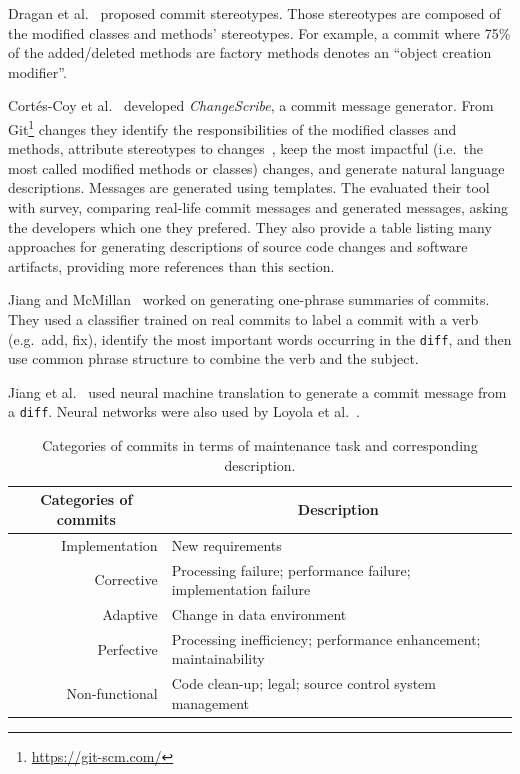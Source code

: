\documentclass[a4paper,11pt]{sdm_internship}
\theoremstyle{definition}
\begin{document}
Dragan et al.~\cite{dragan2011using} proposed commit stereotypes.
Those stereotypes are composed of the modified classes and methods' stereotypes.
For example, a commit where 75\% of the added/deleted methods are factory methods denotes an ``object creation modifier''.

Cort\'es-Coy et al.~\cite{cortes2014automatically,linares2015changescribe} developed \textit{ChangeScribe}, a commit message generator.
From Git\footnote{\url{https://git-scm.com/}} changes they identify the responsibilities of the modified classes and methods, attribute stereotypes to changes~\cite{dragan2011using}, keep the most impactful (i.e.\ the most called modified methods or classes) changes, and generate natural language descriptions.
Messages are generated using templates.
The evaluated their tool with survey, comparing real-life commit messages and generated messages, asking the developers which one they prefered.
They also provide a table listing many approaches for generating descriptions of source code changes and software artifacts, providing more references than this section.

Jiang and McMillan~\cite{jiang2017towards} worked on generating one-phrase summaries of commits.
They used a classifier trained on real commits to label a commit with a verb (e.g.\ add, fix), identify the most important words occurring in the \texttt{diff}, and then use common phrase structure to combine the verb and the subject.

Jiang et al.~\cite{jiang2017automatically} used neural machine translation to generate a commit message from a \texttt{diff}.
Neural networks were also used by Loyola et al.~\cite{loyola2017neural}.

\begin{table}
  \centering
  \begin{tabular}{rl}
    \toprule
    \multicolumn{1}{c}{\textbf{Categories of commits}} & \multicolumn{1}{c}{\textbf{Description}} \\
    \midrule
    Implementation & New requirements \\
    Corrective & Processing failure; performance failure; implementation failure \\
    Adaptive & Change in data environment \\
    Perfective & Processing inefficiency; performance enhancement; maintainability \\
    Non-functional & Code clean-up; legal; source control system management \\
    \bottomrule
  \end{tabular}
  \caption{Categories of commits in terms of maintenance task and corresponding description.}%
  \label{tab:commit_categories}
\end{table}
\end{document}
